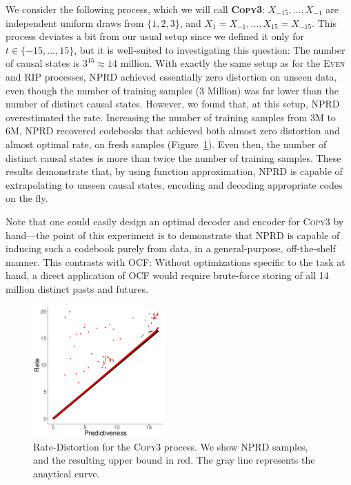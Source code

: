 \documentclass[entropy,article,submit,moreauthors,pdftex,10pt,a4paper]{Definitions/mdpi}
\newcommand{\key}{\textbf}
\begin{document}
We consider the following process, which we will call \key{\textsc{Copy3}}: $X_{-15}, ..., X_{-1}$ are independent uniform draws from $\{1,2,3\}$, and $X_1 = X_{-1}, ..., X_{15} = X_{-15}$.
This process deviates a bit from our usual setup since we defined it only for $t \in \{-15, ..., 15\}$, but it is well-suited to investigating this question:
The number of causal states is $3^{15} \approx 14$ million.
With exactly the same setup as for the \textsc{Even} and \textsc{RIP} processes, NPRD achieved essentially zero distortion on unseen data, even though the number of training samples (3 Million) was far lower than the number of distinct causal states.
However, we found that, at this setup, NPRD overestimated the rate.
Increasing the number of training samples from 3M to 6M, NPRD recovered codebooks that achieved both almost zero distortion and almost optimal rate, on fresh samples (Figure~\ref{fig:repeat}).
Even then, the number of distinct causal states is more than twice the number of training samples.
These results demonstrate that, by using function approximation, NPRD is capable of extrapolating to unseen causal states, encoding and decoding appropriate codes on the fly.


Note that one could easily design an optimal decoder and encoder for \textsc{Copy3} by hand---the point of this experiment is to demonstrate that NPRD is capable of inducing such a codebook purely from data, in a general-purpose, off-the-shelf manner.
This contrasts with OCF:
Without optimizations specific to the task at hand, a direct application of OCF would require brute-force storing of all 14 million distinct pasts and futures.



\begin{figure}
\centering
\includegraphics[width=0.45\textwidth]{code/figures/repeat3-info.pdf}
	\caption{Rate-Distortion for the \textsc{Copy3} process. We show NPRD samples, and the resulting upper bound in red. The gray line represents the anaytical curve.}\label{fig:repeat}
\end{figure}
\end{document}
